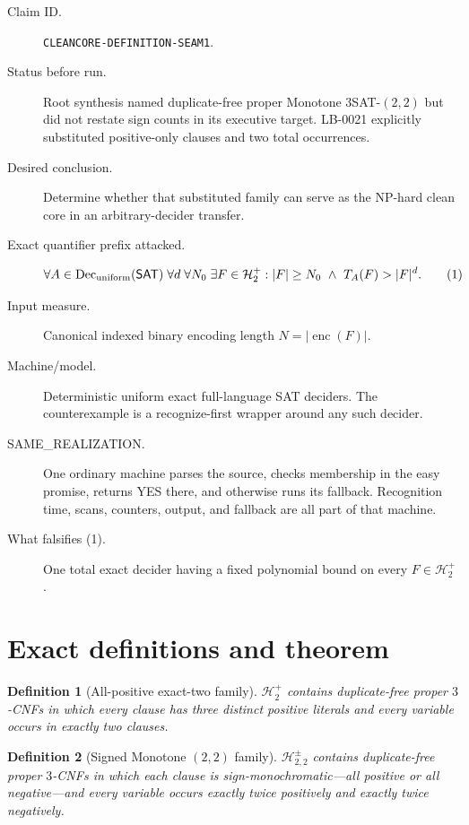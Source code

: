 \documentclass[11pt]{article}
\newtheorem{definition}{Definition}
\newcommand{\SAT}{\mathsf{SAT}}
\newcommand{\Hplus}{\mathcal H^{+}_{2}}
\newcommand{\Hsigned}{\mathcal H^{\pm}_{2,2}}
\begin{document}
\begin{description}
\item[Claim ID.] \texttt{CLEANCORE-DEFINITION-SEAM1}.
\item[Status before run.] Root synthesis named duplicate-free proper
Monotone $3$SAT-$(2,2)$ but did not restate sign counts in its executive
target.  LB-0021 explicitly substituted positive-only clauses and two total
occurrences.
\item[Desired conclusion.] Determine whether that substituted family can
serve as the NP-hard clean core in an arbitrary-decider transfer.
\item[Exact quantifier prefix attacked.]
\[
 \forall A\in\operatorname{Dec}_{\rm uniform}(\SAT)\;
 \forall d\;\forall N_0\;\exists F\in\Hplus:
 |F|\ge N_0\ \wedge\ T_A(F)>|F|^d.
 \tag{1}
\]
\item[Input measure.] Canonical indexed binary encoding length
$N=|\operatorname{enc}(F)|$.
\item[Machine/model.] Deterministic uniform exact full-language SAT
deciders.  The counterexample is a recognize-first wrapper around any such
decider.
\item[SAME\_REALIZATION.] One ordinary machine parses the source, checks
membership in the easy promise, returns YES there, and otherwise runs its
fallback.  Recognition time, scans, counters, output, and fallback are all
part of that machine.
\item[What falsifies (1).] One total exact decider having a fixed polynomial
bound on every $F\in\Hplus$.
\end{description}

\section{Exact definitions and theorem}

\begin{definition}[All-positive exact-two family]
$\Hplus$ contains duplicate-free proper $3$-CNFs in which every clause has
three distinct positive literals and every variable occurs in exactly two
clauses.
\end{definition}

\begin{definition}[Signed Monotone $(2,2)$ family]
$\Hsigned$ contains duplicate-free proper $3$-CNFs in which each clause is
sign-monochromatic---all positive or all negative---and every variable
occurs exactly twice positively and exactly twice negatively.
\end{definition}
\end{document}
